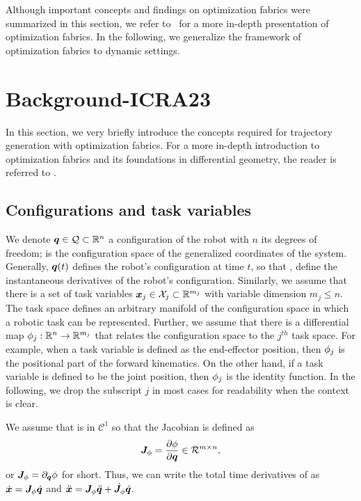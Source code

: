 Although important concepts and findings on optimization fabrics were summarized in this
section, we refer to~\cite{Ratliff2020} for a more in-depth presentation of optimization
fabrics. In the following, we generalize the framework of optimization fabrics to dynamic settings.

\section{Background-ICRA23}
\label{sec:optimization_fabrics}
%
In this section, we very briefly introduce the concepts required for trajectory
generation with optimization fabrics. For a more in-depth introduction to
optimization fabrics and its foundations in differential geometry, the reader
is referred to \cite{Ratliff2020,Spahn2022,Wyk2022}.
%
\subsection{Configurations and task variables}%
\label{sub:configurations_and_task_variables}
%
We denote $\bm{q}\in\mathcal{Q}\subset\mathbb{R}^n$ a
configuration of the robot with $n$ its degrees of freedom;
\Q{} is the configuration space of the generalized coordinates
of the system. Generally, $\bm{q}(t)$ defines the robot's configuration at time $t$, so that 
\qdot, \qddot{} define the instantaneous derivatives of the robot's configuration.
Similarly, we assume
that there is a set of task variables $\bm{x}_j\in\mathcal{X}_j\subset\mathbb{R}^{m_j}$ with variable dimension
$m_j \leq n$. The task space \Xj{} defines an arbitrary manifold of the configuration
space \Q{} in which a robotic task can be represented. 
Further, we assume that there is a differential map
$\phi_j:\mathbb{R}^n\rightarrow\mathbb{R}^{m_j}$ that relates the configuration space to the $j^{th}$ task
space. For example, when a task variable is defined as the end-effector position, then
$\phi_j$ is the positional part of the forward kinematics. On the other hand, if a task
variable is defined to be the joint position, then $\phi_j$ is the identity function. 
In the following, we drop the subscript $j$ in most cases for readability when the
context is clear.

We assume that \map{} is in $\mathcal{C}^1$ so that the Jacobian is
defined as
\begin{equation}
  \bm{J}_{\phi} = \frac{\partial\phi}{\partial\bm{q}} \in \mathcal{R}^{m\times n}, 
\end{equation}
or $\bm{J}_{\phi} = \partial_{\bm{q}}\phi$ for short.
Thus, we can write the total time derivatives of \x{} as
$\dot{\bm{x}} = \bm{J}_{\phi}\dot{\bm{q}}$ and $\ddot{\bm{x}} = \bm{J}_{\phi}\ddot{\bm{q}} + \dot{\bm{J}}_{\phi}\dot{\bm{q}}$.
%
